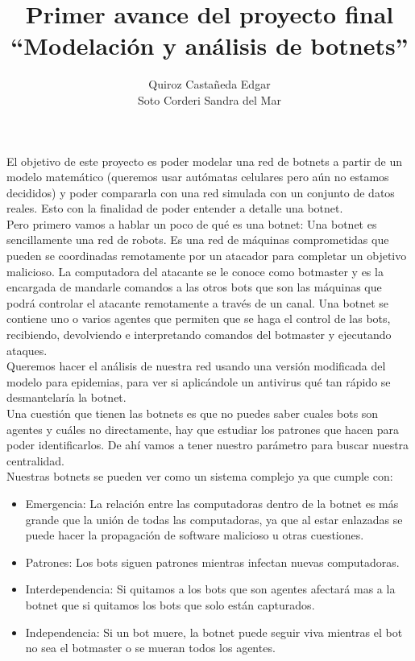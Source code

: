 \documentclass[12pt]{extreport}
\title{
	Primer avance del proyecto final\\ 
	``Modelación y análisis de botnets''
}
\author{
	Quiroz Castañeda Edgar \\
	Soto Corderi Sandra del Mar
}
\makeatletter
\renewcommand{\maketitle}{
	\bgroup\setlength{\parindent}{0pt}
	
	\begin{flushright}
		\@author
	\end{flushright}
	
	\begin{flushleft}
		\textbf{\@title}
	\end{flushleft}
	
	\egroup
}
\makeatother
\begin{document}
 \maketitle
	
	El objetivo de este proyecto es poder modelar una red de botnets a partir de un modelo matemático (queremos usar autómatas celulares pero aún no estamos decididos) y poder compararla con una red simulada con un conjunto de datos reales. Esto con la finalidad de poder entender a detalle una botnet.\\
	
	Pero primero vamos a hablar  un poco de qué es una botnet:
	Una botnet es sencillamente una red de robots. Es una red de máquinas comprometidas que pueden se coordinadas remotamente por un atacador para completar un objetivo malicioso. La computadora del atacante se le conoce como botmaster y es la encargada de mandarle comandos a las otros bots que son las máquinas que podrá controlar el atacante remotamente a través de un canal. 
	Una botnet se contiene uno o varios agentes que permiten que se haga el control de las bots, recibiendo, devolviendo e interpretando comandos del botmaster y ejecutando ataques.
	\\
	
	Queremos hacer el análisis de nuestra red usando una versión modificada del modelo para epidemias, para ver si aplicándole un antivirus qué tan rápido se desmantelaría la botnet.\\
	
	Una cuestión que tienen las botnets es que no puedes saber cuales bots son agentes y cuáles no directamente, hay que estudiar los patrones que hacen para poder identificarlos. De ahí vamos a tener nuestro parámetro para buscar nuestra centralidad.\\
	
	Nuestras botnets se pueden ver como un sistema complejo ya que cumple con:
	\begin{itemize}
		\item Emergencia: La relación entre las computadoras dentro de la botnet es más grande que la unión de todas las computadoras, ya que al estar enlazadas se  puede hacer la propagación de software malicioso u otras cuestiones.
		\item Patrones: Los bots siguen patrones mientras infectan nuevas computadoras. 
		\item Interdependencia: Si quitamos a los bots que son agentes afectará mas a la botnet que si quitamos los bots  que solo están capturados.
		\item Independencia: Si un bot muere, la botnet puede seguir viva mientras el bot no sea el botmaster o se mueran todos los agentes.
	\end{itemize}
		
\end{document}
